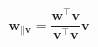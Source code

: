 \documentclass[12 pt]{slides}
\begin{document}
\begingroup
\[\textbf{w}_{\parallel\textbf{v}} = \frac{\textbf{w}^{\intercal}\textbf{v}}{\textbf{v}^{\intercal}\textbf{v}}\textbf{v} \]
\endgroup
\end{document}
